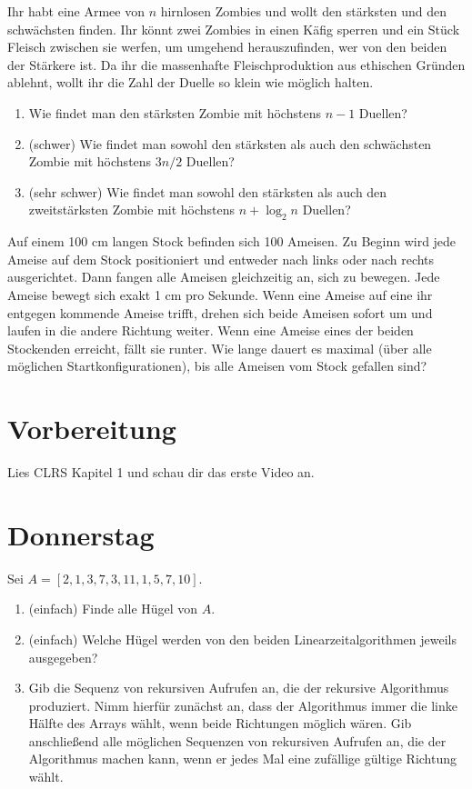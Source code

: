 \documentclass{uebung_cs}
\begin{document}
\begin{aufgabe}
	Ihr habt eine Armee von $n$ hirnlosen Zombies und wollt den stärksten und den schwächsten finden. Ihr könnt zwei Zombies in einen Käfig sperren und ein Stück Fleisch zwischen sie werfen, um umgehend herauszufinden, wer von den beiden der Stärkere ist. Da ihr die massenhafte Fleischproduktion aus ethischen Gründen ablehnt, wollt ihr die Zahl der Duelle so klein wie möglich halten.
	\begin{enumerate}
		\item Wie findet man den stärksten Zombie mit höchstens $n-1$ Duellen?
		\item (schwer) Wie findet man sowohl den stärksten als auch den schwächsten Zombie mit höchstens $3n/2$ Duellen?
		\item (sehr schwer) Wie findet man sowohl den stärksten als auch den zweitstärksten Zombie mit höchstens $n+\log_2 n$ Duellen?
	\end{enumerate}
\end{aufgabe}

\begin{aufgabe}\label{tue-last}
	Auf einem 100 cm langen Stock befinden sich 100 Ameisen.
	Zu Beginn wird jede Ameise auf dem Stock positioniert und entweder nach links oder nach rechts ausgerichtet.
	Dann fangen alle Ameisen gleichzeitig an, sich zu bewegen.
	Jede Ameise bewegt sich exakt 1 cm pro Sekunde. Wenn eine Ameise auf eine ihr entgegen kommende Ameise trifft, drehen sich beide Ameisen sofort um und laufen in die andere Richtung weiter.
	Wenn eine Ameise eines der beiden Stockenden erreicht, fällt sie runter.
	Wie lange dauert es maximal (über alle möglichen Startkonfigurationen), bis alle Ameisen vom Stock gefallen sind?
\end{aufgabe}

\section*{Vorbereitung}
Lies CLRS Kapitel 1 und schau dir das erste Video an.

\section*{Donnerstag}
\begin{aufgabe}[Hügel]\label{thu-first}
	Sei $A = [2, 1, 3, 7, 3, 11, 1, 5, 7, 10]$.
	\begin{enumerate}
		\item \bestehen (einfach) Finde alle Hügel von $A$.
		\item \bestehen (einfach) Welche Hügel werden von den beiden Linearzeitalgorithmen jeweils ausgegeben?
		\item \bestehen Gib die Sequenz von rekursiven Aufrufen an, die der rekursive Algorithmus produziert. Nimm hierfür zunächst an, dass der Algorithmus immer die linke Hälfte des Arrays wählt, wenn beide Richtungen möglich wären. Gib anschließend alle möglichen Sequenzen von rekursiven Aufrufen an, die der Algorithmus machen kann, wenn er jedes Mal eine zufällige gültige Richtung wählt.
	\end{enumerate}
\end{aufgabe}
\end{document}
